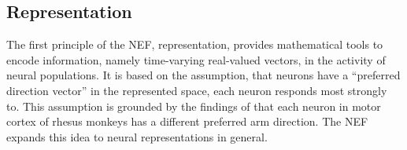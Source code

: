 \subsection{Representation}
\label{subsec:nef_representation}
The first principle of the \ac{NEF}, representation, provides mathematical tools to encode information, namely time-varying real-valued vectors, in the activity of neural populations.
It is based on the assumption, that neurons have a \enquote{preferred direction vector} in the represented space, each neuron responds most strongly to.
This assumption is grounded by the findings of \textcite{Georgopoulos1989} that each neuron in motor cortex of rhesus monkeys has a different preferred arm direction.
The \ac{NEF} expands this idea to neural representations in general.
\begin{figure}[t!]
	\centering
	\\
	\vspace{-0.4cm}
\end{figure}
